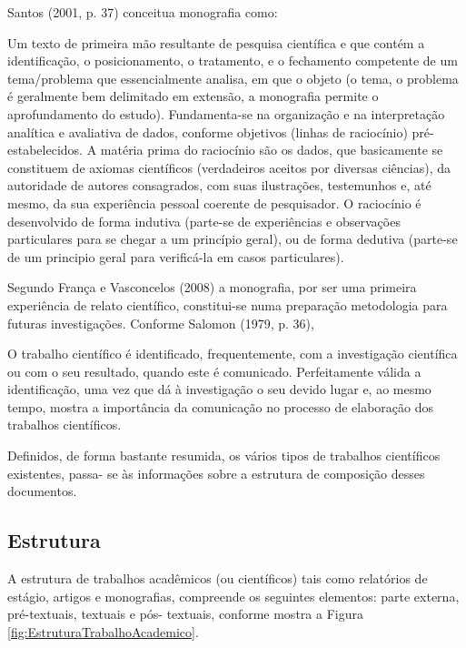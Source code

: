 \documentclass[a4paper,12pt]{article}  %
\begin{document}
\begin{ElementosTextuais}
\begin{Desenvolvimento}
Santos (2001, p. 37) conceitua monografia como:
\begin{citacaodireta}
Um texto de primeira mão resultante de pesquisa científica e que contém a identificação, o posicionamento, o tratamento, e o fechamento competente de um tema/problema que essencialmente analisa, em que o objeto (o tema, o problema é geralmente bem delimitado em extensão, a monografia permite o aprofundamento do estudo). Fundamenta-se na organização e na interpretação analítica e avaliativa de dados, conforme objetivos (linhas de raciocínio) pré-estabelecidos. A matéria prima do raciocínio são os dados, que basicamente se constituem de axiomas científicos (verdadeiros aceitos por diversas ciências), da autoridade de autores consagrados, com suas ilustrações, testemunhos e, até mesmo, da sua experiência pessoal coerente de pesquisador. O raciocínio é desenvolvido de forma indutiva (parte-se de experiências e observações particulares para se chegar a um princípio geral), ou de forma dedutiva (parte-se de um principio geral para verificá-la em casos particulares).
\end{citacaodireta}

Segundo França e Vasconcelos (2008) a monografia, por ser uma primeira experiência de relato científico, constitui-se numa preparação metodologia para futuras investigações. Conforme Salomon (1979, p. 36),

\begin{citacaodireta}
O trabalho científico é identificado, frequentemente, com a investigação científica ou com o seu resultado, quando este é comunicado. Perfeitamente válida a identificação, uma vez que dá à investigação o seu devido lugar e, ao mesmo tempo, mostra a importância da comunicação no processo de elaboração dos trabalhos científicos.
\end{citacaodireta}

Definidos, de forma bastante resumida, os vários tipos de trabalhos científicos existentes, passa- se às informações sobre a estrutura de composição desses documentos.

\subsection{Estrutura}
A estrutura de trabalhos acadêmicos (ou científicos) tais como relatórios de estágio, artigos e monografias, compreende os seguintes elementos: parte externa, pré-textuais, textuais e pós- textuais, conforme mostra a Figura \ref{fig:EstruturaTrabalhoAcademico}.


\end{Desenvolvimento}
\end{ElementosTextuais}
\end{document}
